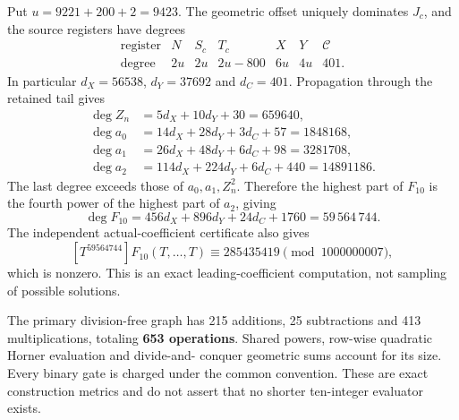 Put $u=9221+200+2=9423$. The geometric offset uniquely dominates
$J_c$, and the source registers have degrees
\[
\begin{array}{c|rrrrrr}
\text{register}&N&S_c&T_c&X&Y&\mathcal C\\\hline
\text{degree}&2u&2u&2u-800&6u&4u&401.
\end{array}
\]
In particular $d_X=56538$, $d_Y=37692$ and $d_C=401$.
Propagation through the retained tail gives
\begin{align*}
 \deg Z_n&=5d_X+10d_Y+30=659640,\\
 \deg a_0&=14d_X+28d_Y+3d_C+57=1848168,\\
 \deg a_1&=26d_X+48d_Y+6d_C+98=3281708,\\
 \deg a_2&=114d_X+224d_Y+6d_C+440=14891186.
\end{align*}
The last degree exceeds those of $a_0,a_1,Z_n^2$. Therefore the
highest part of $F_{10}$ is the fourth power of the highest part
of $a_2$, giving
\[
 \deg F_{10}
 =456d_X+896d_Y+24d_C+1760
 =59\,564\,744.
\]
The independent actual-coefficient certificate also gives
\[
 [T^{59564744}]F_{10}(T,\ldots,T)
 \equiv285435419\pmod{1000000007},
\]
which is nonzero. This is an exact leading-coefficient computation,
not sampling of possible solutions.

The primary division-free graph has 215 additions, 25 subtractions
and 413 multiplications, totaling \textbf{653 operations}.
Shared powers, row-wise quadratic Horner evaluation and divide-and-
conquer geometric sums account for its size. Every binary gate is
charged under the common convention. These are exact construction
metrics and do not assert that no shorter ten-integer evaluator exists.
